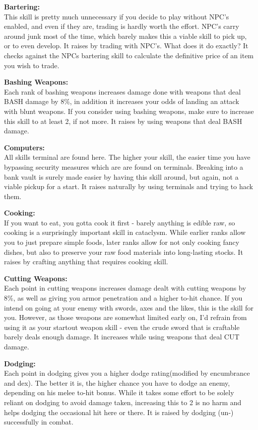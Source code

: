 \textbf{Bartering:}\\This skill is pretty much unnecessary if you decide to play without NPC's enabled, and even if they are, trading is hardly worth the effort. NPC's carry around junk most of the time, which barely makes this a viable skill to pick up, or to even develop. It raises by trading with NPC's. What does it do exactly? It checks against the NPCs bartering skill to calculate the definitive price of an item you wish to trade.

\textbf{Bashing Weapons:}\\Each rank of bashing weapons increases damage done with weapons that deal BASH damage by 8\%, in addition it increases your odds of landing an attack with blunt weapons. If you consider using bashing weapons, make sure to increase this skill to at least 2, if not more. It raises by using weapons that deal BASH damage.

\textbf{Computers:}\\All skills terminal are found here. The higher your skill, the easier time you have bypassing security measures which are are found on terminals. Breaking into a bank vault is surely made easier by having this skill around, but again, not a viable pickup for a start. It raises naturally by using terminals and trying to hack them.

\textbf{Cooking:}\\If you want to eat, you gotta cook it first - barely anything is edible raw, so cooking is a surprisingly important skill in cataclysm. While earlier ranks allow you to just prepare simple foods, later ranks allow for not only cooking fancy dishes, but also to preserve your raw food materials into long-lasting stocks. It raises by crafting anything that requires cooking skill.

\textbf{Cutting Weapons:}\\Each point in cutting weapons increases damage dealt with cutting weapons by 8\%, as well as giving you armor penetration and a higher to-hit chance. If you intend on going at your enemy with swords, axes and the likes, this is the skill for you. However, as those weapons are somewhat limited early on, I'd refrain from using it as your startout weapon skill - even the crude sword that is craftable barely deals enough damage. It increases while using weapons that deal CUT damage.

\textbf{Dodging:}\\Each point in dodging gives you a higher dodge rating(modified by encumbrance and dex). The better it is, the higher chance you have to dodge an enemy, depending on his melee to-hit bonus. While it takes some effort to be solely reliant on dodging to avoid damage taken, increasing this to 2 is no harm and helps dodging the occasional hit here or there. It is raised by dodging (un-) successfully in combat.

